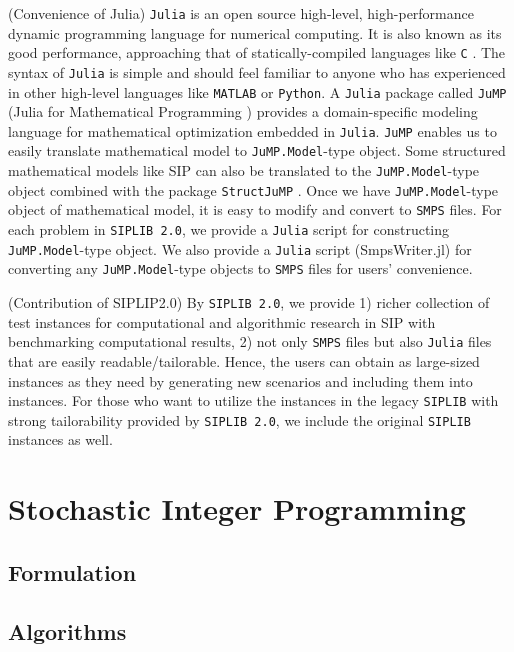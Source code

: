 (Convenience of Julia) \texttt{Julia} is an open source high-level, high-performance dynamic programming language for numerical computing. It is also known as its good performance, approaching that of statically-compiled languages like \texttt{C} \cite{journal:BEKS2017}. The syntax of \texttt{Julia} is simple and should feel familiar to anyone who has experienced in other high-level languages like \texttt{MATLAB} or \texttt{Python}. A \texttt{Julia} package called \texttt{JuMP} (Julia for Mathematical Programming \cite{web:JuMP}) provides a domain-specific modeling language for mathematical optimization embedded in \texttt{Julia}. \texttt{JuMP} enables us to easily translate mathematical model to \texttt{JuMP.Model}-type object. Some structured mathematical models like SIP can also be translated to the \texttt{JuMP.Model}-type object combined with the package \texttt{StructJuMP} \cite{web:StructJuMP}. Once we have \texttt{JuMP.Model}-type object of mathematical model, it is easy to modify and convert to \texttt{SMPS} files. For each problem in \texttt{SIPLIB 2.0}, we provide a \texttt{Julia} script for constructing \texttt{JuMP.Model}-type object. We also provide a \texttt{Julia} script (SmpsWriter.jl) for converting any \texttt{JuMP.Model}-type objects to \texttt{SMPS} files for users' convenience.

(Contribution of SIPLIP2.0) By \texttt{SIPLIB 2.0}, we provide 1) richer collection of test instances for computational and algorithmic research in SIP with benchmarking computational results, 2) not only \texttt{SMPS} files but also \texttt{Julia} files that are easily readable/tailorable. Hence, the users can obtain as large-sized instances as they need by generating new scenarios and including them into instances. For those who want to utilize the instances in the legacy \texttt{SIPLIB} with strong tailorability provided by \texttt{SIPLIB 2.0}, we include the original \texttt{SIPLIB} instances as well.
\section{Stochastic Integer Programming}

\subsection{Formulation}


\subsection{Algorithms}
